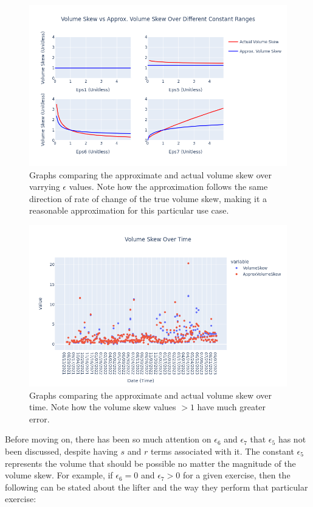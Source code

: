 \begin{figure}[htb]
    \centering
    \includegraphics[scale=0.55]{images/ch3/ApproxVsActualVolumeSkew.basic.png}
    \caption{Graphs comparing the approximate and actual volume skew over varrying $\epsilon$ values. Note how the approximation follows the same direction of rate of change of the true volume skew, making it a reasonable approximation for this particular use case.}
    \label{fig:ApproximateVsActualVolumeSkew}
\end{figure}
\begin{figure}[htb]
    \centering
    \includegraphics[scale=0.55]{images/ch3/volumeSkewOverTime.png}
    \caption{Graphs comparing the approximate and actual volume skew over time. Note how the volume skew values $>1$ have much greater error.}
    \label{fig:ApproximateVsActualVolumeSkewOverTime}
\end{figure}

Before moving on, there has been so much attention on $\epsilon_6$ and $\epsilon_7$ that $\epsilon_5$ has not been discussed, despite having $s$ and $r$ terms associated with it. The constant $\epsilon_5$ represents the volume that should be possible no matter the magnitude of the volume skew. For example, if $\epsilon_6=0$ and $\epsilon_7>0$ for a given exercise, then the following can be stated about the lifter and the way they perform that particular exercise:

